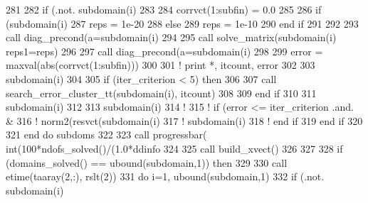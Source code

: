 \begin{DoxyCode}
{{281             
282             \textcolor{keywordflow}{if} (.not. subdomain(i)%
283 
284               corrvct(1:subfin) = 0.0
285 
286               \textcolor{keywordflow}{if} (subdomain(i)%
287                 reps = 1e-20
288               \textcolor{keywordflow}{else}
289                 reps = 1e-10
290 \textcolor{keywordflow}{              end if}
291 
292 
293               \textcolor{keyword}{call }diag_precond(a=subdomain(i)%
294               
295               \textcolor{keyword}{call }solve_matrix(subdomain(i)%
      reps1=reps)
296 
297               \textcolor{keyword}{call }diag_precond(a=subdomain(i)%
298               
299               error = maxval(abs(corrvct(1:subfin)))
300               
301 \textcolor{comment}{!             print *, itcount, error}
302               
303               subdomain(i)%
304               
305               \textcolor{keywordflow}{if} (iter_criterion < 5) \textcolor{keywordflow}{then}
306 
307                 \textcolor{keyword}{call }search\_error\_cluster\_tt(subdomain(i), itcount) 
308                 
309 \textcolor{keywordflow}{              end if}
310               
311               subdomain(i)%
312 
313               subdomain(i)%
314 \textcolor{comment}{!             }
315 \textcolor{comment}{!             if (error <= iter\_criterion .and. &}
316 \textcolor{comment}{!             norm2(resvct(subdomain(i)%
317 \textcolor{comment}{!               subdomain(i)%
318 \textcolor{comment}{!             end if}
319 \textcolor{keywordflow}{            end if}
320                                         
321 \textcolor{keywordflow}{          end do} subdoms
322                     
323           \textcolor{keyword}{call }progressbar( int(100*ndofs_solved()/(1.0*ddinfo%
324 
325           \textcolor{keyword}{call }build_xvect()
326           
327 
328           \textcolor{keywordflow}{if} (domains_solved() == ubound(subdomain,1)) \textcolor{keywordflow}{then}
329 
330             \textcolor{keyword}{call }etime(taaray(2,:), rslt(2))
331             \textcolor{keywordflow}{do} i=1, ubound(subdomain,1)
332               \textcolor{keywordflow}{if} (.not. subdomain(i)%
}}}}
\end{DoxyCode}
